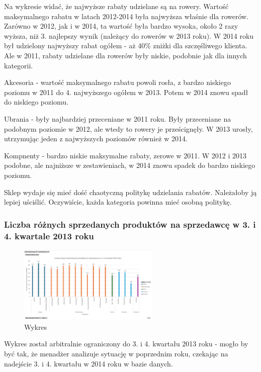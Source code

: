 \documentclass[a4paper,12pt]{article}
\begin{document}
Na wykresie widać, że najwyższe rabaty udzielane są na rowery. Wartość maksymalnego rabatu w latach 2012-2014 była najwyższa właśnie dla rowerów. Zarówno w 2012, jak i w 2014, ta wartość była bardzo wysoka, około 2 razy wyższa, niż 3. najlepszy wynik (należący do rowerów w 2013 roku). W 2014 roku był udzielony najwyższy rabat ogółem - aż 40\% zniżki dla szczęśliwego klienta.
Ale w 2011, rabaty udzielane dla rowerów były niskie, podobnie jak dla innych kategorii.

Akcesoria - wartość maksymalnego rabatu powoli rosła, z bardzo niskiego poziomu w 2011 do 4. najwyższego ogółem w 2013. Potem w 2014 znowu spadł do niskiego poziomu.

Ubrania - były najbardziej przeceniane w 2011 roku. Były przeceniane na podobnym poziomie w 2012, ale wtedy to rowery je prześcignęły. W 2013 urosły, utrzymując jeden z najwyższych poziomów również w 2014.

Kompnenty - bardzo niskie maksymalne rabaty, zerowe w 2011. W 2012 i 2013 podobne, ale najniższe w zestawieniach, w 2014 znowu spadek do bardzo niskiego poziomu.

Sklep wydaje się mieć dość chaotyczną politykę udzielania rabatów. Należałoby ją lepiej uściślić. Oczywiście, każda kategoria powinna mieć osobną politykę.

\subsubsection{Liczba różnych sprzedanych produktów na sprzedawcę w 3. i 4. kwartale 2013 roku}

\begin{figure}[H]
  \centering
  \includegraphics[width=0.6\textwidth]{sales_salesperson.png}
  \caption{Wykres}
\end{figure}

Wykres został arbitralnie ograniczony do 3. i 4. kwartału 2013 roku - mogło by być tak, że menadżer analizuje sytuację w poprzednim roku, czekając na nadejście 3. i 4. kwartału w 2014 roku w bazie danych.
\end{document}
